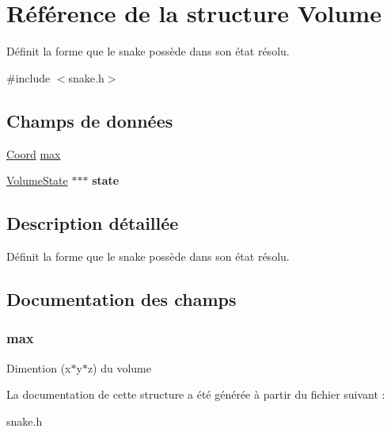 \hypertarget{struct_volume}{\section{Référence de la structure Volume}
\label{struct_volume}
}


Définit la forme que le snake possède dans son état résolu.  




{\ttfamily \#include $<$snake.\-h$>$}

\subsection*{Champs de données}
\begin{DoxyCompactItemize}
\item 
\hyperlink{struct_coord}{Coord} \hyperlink{struct_volume_aa83862769f78fffb512bc9283007ef67}{max}
\item 
\hypertarget{struct_volume_a96775002e6d2b0c5c4349b77ad4326d2}{\hyperlink{group___snake_gafe6214172a8f4085f7b16ce6523dcf7f}{Volume\-State} $\ast$$\ast$$\ast$ {\bfseries state}}\label{struct_volume_a96775002e6d2b0c5c4349b77ad4326d2}

\end{DoxyCompactItemize}


\subsection{Description détaillée}
Définit la forme que le snake possède dans son état résolu. 

\subsection{Documentation des champs}
\hypertarget{struct_volume_aa83862769f78fffb512bc9283007ef67}{
\subsubsection[{max}]{\setlength{\rightskip}{0pt plus 5cm}max}}\label{struct_volume_aa83862769f78fffb512bc9283007ef67}
Dimention (x$\ast$y$\ast$z) du volume 

La documentation de cette structure a été générée à partir du fichier suivant \-:\begin{DoxyCompactItemize}
\item 
snake.\-h\end{DoxyCompactItemize}

